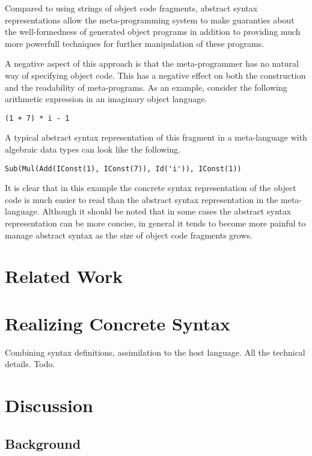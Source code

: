 \documentclass[a4paper,11pt]{article}
\begin{document}
Compared to using strings of object code fragments, abstract syntax
representations allow the meta-programming system to make guaranties about the
well-formedness of generated object programs in addition to providing much more
powerfull techniques for further manipulation of these programs.

A negative aspect of this approach is that the meta-programmer has no natural
way of specifying object code. This has a negative effect on both the
construction and the readability of meta-programs. As an example, consider the
following arithmetic expression in an imaginary object language.
\begin{lstlisting}[title=Example expression in concrete syntax]
(1 + 7) * i - 1
\end{lstlisting}
A typical abstract syntax representation of this fragment in a meta-language
with algebraic data types can look like the following.
\begin{lstlisting}[title=Example expression in abstract syntax]
Sub(Mul(Add(IConst(1), IConst(7)), Id('i')), IConst(1))
\end{lstlisting}
It is clear that in this example the concrete syntax representation of the
object code is much easier to read than the abstract syntax representation in
the meta-language. Although it should be noted that in some cases the abstract
syntax representation can be more concise, in general it tends to become more
painful to manage abstract syntax as the size of object code fragments grows.




\section{Related Work}\label{sec:related}





\section{Realizing Concrete Syntax}

Combining syntax definitions, assimilation to the host language.
All the technical details.
Todo.


\section{Discussion}


\subsection{Background}
\end{document}
